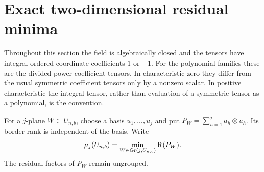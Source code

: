 
\section{Exact two-dimensional residual minima}

Throughout this section the field is algebraically closed and the tensors
have integral ordered-coordinate coefficients \(1\) or \(-1\). For the
polynomial families these are the divided-power coefficient tensors.
In characteristic zero they differ from the usual symmetric coefficient
tensors only by a nonzero scalar. In positive characteristic the integral
tensor, rather than evaluation of a symmetric tensor as a polynomial, is
the convention.

For a \(j\)-plane \(W\subset U_{n,b}\), choose a basis \(u_1,\ldots,u_j\)
and put \(P_W=\sum_{h=1}^j a_h\otimes u_h\). Its border rank is independent
of the basis. Write
\[
 \mu_j(U_{n,b})=\min_{W\in\operatorname{Gr}(j,U_{n,b})}\underline{\mathrm R}(P_W).
\]
The residual factors of \(P_W\) remain ungrouped.

